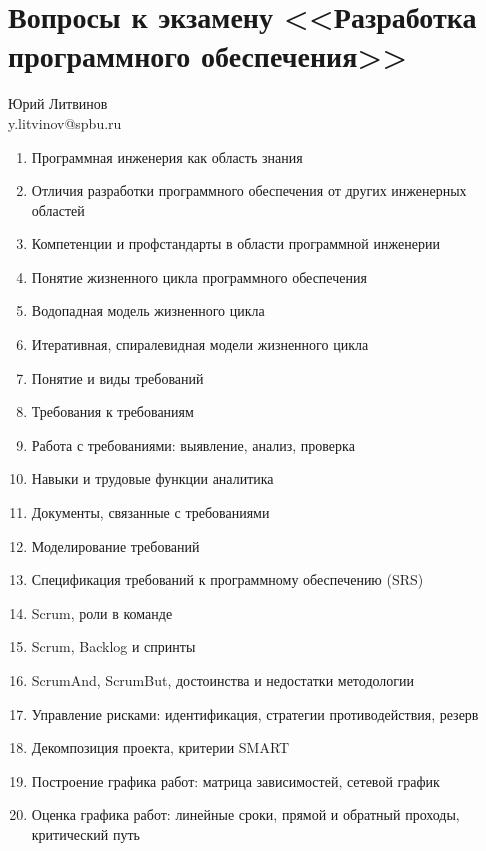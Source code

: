 \documentclass[a5paper]{article}
\begin{document}
\thispagestyle{empty}

\section*{Вопросы к экзамену <<Разработка программного обеспечения>>}

\begin{flushright}\begin{small}Юрий Литвинов\\\small{y.litvinov@spbu.ru}\end{small}\end{flushright}

\begin{enumerate}
    \item Программная инженерия как область знания
    \item Отличия разработки программного обеспечения от других инженерных областей
    \item Компетенции и профстандарты в области программной инженерии
    \item Понятие жизненного цикла программного обеспечения
    \item Водопадная модель жизненного цикла
    \item Итеративная, спиралевидная модели жизненного цикла
    \item Понятие и виды требований
    \item Требования к требованиям
    \item Работа с требованиями: выявление, анализ, проверка
    \item Навыки и трудовые функции аналитика
    \item Документы, связанные с требованиями
    \item Моделирование требований
    \item Спецификация требований к программному обеспечению (SRS)
    \item Scrum, роли в команде
    \item Scrum, Backlog и спринты
    \item ScrumAnd, ScrumBut, достоинства и недостатки методологии
    \item Управление рисками: идентификация, стратегии противодействия, резерв
    \item Декомпозиция проекта, критерии SMART
    \item Построение графика работ: матрица зависимостей, сетевой график
    \item Оценка графика работ: линейные сроки, прямой и обратный проходы, критический путь

\end{enumerate}
\end{document}
